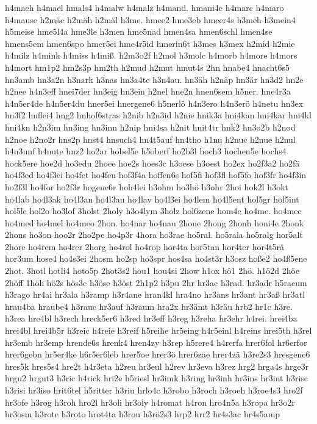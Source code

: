 {h4maeh
h4mael
hmals4
h4malw
h4malz
h4mand.
hmani4e
h4marc
h4maro
h4mause
h2mäc
h2mäh
h2mäl
h3me.
hmee2
hme3eb
hmeer4s
h3meh
h3mein4
h5meise
hme5l4a
hme3le
h3men
hme5nad
hmen4sa
hmen6schl
hmen4se
hmens5em
hmen6spo
hmer5ei
hme4r5id
hmerin6t
h3mes
h3mex
h2mid
h2mie
h4milz
h4mink
h4miss
h4miß.
h2m3o2f
h2mol
h3molc
h4morb
h4more
h4mors
h4mort
hm1p2
hm2s3p
hm2th
h2mud
h2mut
hmut4s
2hn
hnabe4
hnacht6s5
hn3amb
hn3a2n
h3nark
h3nas
hn3a4te
h3n4au.
hn3äh
h2näp
hn3är
hn3d2
hn2e
h2nee
h4n3eff
hnei7der
hn3eig
hn3ein
h2nel
hne2n
hnen6sem
h5ner.
hne4r3a
h4n5er4de
h4n5er4du
hner5ei
hnergene6
h5nerlö
h4n3ero
h4n3erö
h4netu
hn3ex
hn3f2
hnflei4
hng2
hnhof6stras
h2nib
h2n3id
h2nie
hnik3a
hni4kan
hni4kar
hni4kl
hni4kn
h2n3im
hn3ing
hn3inn
h2nip
hni4sa
h2nit
hnit4tr
hnk2
hn3o2b
h2nod
h2noe
h2no2r
hns2p
hnst4
hnsuch4
hn4t5auf
hn4tho
h1nu
h2nuc
h2nue
h2nul
h4n3unf
h4nute
hnz2
ho2ar
hobel5e
h5oberf
ho2b3l
hoch3
hochen5e
hochs4
hock5ere
hoe2d
ho3edu
2hoee
hoe2s
hoes3c
h3oese
h3oest
ho2ex
ho2f3a2
ho2fä
ho4f3ed
ho4f3ei
ho4fet
ho4feu
hof3f4a
hoffen6s
hof5fi
hof3fl
hof5fo
hof3fr
ho4f3in
ho2f3l
ho4for
ho2f3r
hogene6r
hoh4lei
h3ohm
ho3hö
h3ohr
2hoi
hok2l
h3okt
ho4lab
ho4l3ak
ho4l3an
ho4l3au
ho4lav
ho4l3ei
ho4lem
ho4l5ent
hol5gr
hol5int
hol5le
hol2o
ho3lof
3holst
2holy
h3o4lym
3holz
hol6zene
hom4e
ho4me.
ho4mec
ho4med
ho4mel
ho4meo
2hon.
ho4nar
ho4nau
2hone
2hong
2honh
honi4e
2honk
2hons
ho3on
hoo2r
2ho2pe
ho4p3r
4hora
ho3rae
ho5ral.
ho5rala
ho5ralg
hor5alt
2hore
ho4rem
ho4rer
2horg
ho4rol
ho4rop
hor4ta
hor5tan
hor4ter
hor4t5rä
hor3um
hose4
ho4s3ei
2hosm
ho2sp
ho3spr
hos4sa
ho4st3r
h3osz
hoße2
ho4ß5ene
2hot.
3hotl
hotli4
hoto5p
2hot3s2
hou1
hou4si
2how
h1ox
hô1
2hö.
h1ö2d
2höe
2höff
1höh
hö2s
hös3c
h3öse
h3öst
2h1p2
h3pu
2hr
hr3ac
h3rad.
hr3adr
h5raeum
h3rago
hr4ai
hr3ala
h3ramp
h3r4ane
hran4kl
hra4no
hr3ans
hr3ant
hr3aß
hr3atl
hrau4ba
hraube4
h3rauc
hr3auf
h3raum
hra2x
hr3ämt
h3räu
hrb2
hr1c
h3re.
h3rea
hre4bl
h3rech
hreck5er6
h3red
hr3eff
h3reg
h3reha
hr3ehr
h4rei.
hrei4ba
hrei4bl
hrei4b5r
h3reic
h4reie
h3reif
h5reihe
hr5eing
h4r5einl
h4reins
hrei5th
h3rel
hr3emb
hr3emp
hrende6s
hrenk4
hren4zy
h3rep
h5rere4
h4rerfa
hrer6fol
hr6erfor
hrer6gebn
hr5er4ke
h6r5er6leb
hrer5oe
hrer3ö
hrer6zae
hrer4zä
h3re2s3
hresgene6
hres5k
hres5s4
hre2t
h4r3eta
h2reu
hr3eul
h2rev
hr3eva
h3rez
hrg2
hrga4s
hrge3r
hrgu2
hrgut3
h3ric
h4rick
hri2e
h5riesl
hr3imk
h3ring
hr3inh
hr3ins
hr3int
h3risc
h3risi
hr3iso
hrit6tel
h5ritter
h3riu
hrlo4c
h3robo
h3roch
h3roeh
h3roe4s3
hro2f
hr3ofe
h3rog
h3roh
hro2l
hr3oli
hr3oly
h4romat
h4ron
hro4n5a
h3ropa
hr3o2r
hr3osm
h3rote
h3roto
hrot4ta
h3rou
h3rö2s3
hrp2
hrr2
hr4s3ac
hr4s5amp
}
